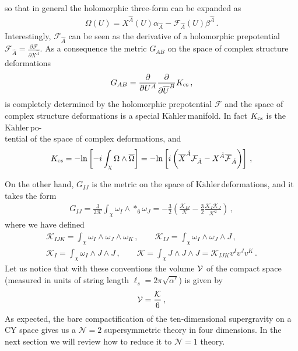 \documentclass[12pt,a4paper]{book}
\newcommand{\Kahler}{\ensuremath{\text{K}\ddot{\text{a}}\text{hler}\,}}
\newcommand{\V}{{\cal{V}}}
\begin{document}
so that in general the holomorphic three-form can be expanded as
\begin{align}
\Omega(U) = X^{\hat{A}}(U) \alpha_{\hat{A}} - \mathcal{F}_{\hat{A}}(U) \beta^{\hat{A}}\,.
\end{align}
Interestingly, $\mathcal{F}_{\hat{A}}$ can be seen as the derivative of a holomorphic prepotential $\mathcal{F}_{\hat{A}} = \frac{\partial \mathcal{F}}{\partial X^{\hat{A}}}$. As a consequence the metric $G_{AB}$ on the space of complex structure deformations
\begin{align}
\label{eq:MetricComplexStructure}
G_{AB} = \frac{\partial}{\partial U^A} \frac{\partial}{\partial \overline{U}^B} K_{\rm cs}\,,
\end{align}
is completely determined by the holomorphic prepotential $\mathcal{F}$ and the space of complex structure deformations is a special \Kahler manifold. In fact $K_{\rm cs}$ is the \Kahler po-\\	tential of the space of complex deformations, and
\begin{align}
\label{eq:KahlerPotentialComplexDeformations}
K_{\rm cs} = - \text{ln} \left[-i \int_{\chi} \Omega \wedge \overline{\Omega}\right] = - \text{ln} \left[i \left(\overline{X}^{\hat{A}} \mathcal{F}_{\hat{A}} - X^{\hat{A}} \overline{\mathcal{F}}_{\hat{A}}\right)\right] \,,
\end{align}

On the other hand, $G_{IJ}$ is the metric on the space of \Kahler deformations, and it takes the form
\begin{align}
\label{eq:MetricKahlerModuli}
G_{IJ} = \frac{3}{2 \mathcal{K}} \int_{\chi} \omega_I \wedge *_6 \omega_J = -\frac{3}{2} \left(\frac{\mathcal{K}_{IJ}}{\mathcal{K}} - \frac{3}{2} \frac{\mathcal{K}_I \mathcal{K}_J}{\mathcal{K}^2}\right)\,,
\end{align}
where we have defined
\begin{align}
\label{eq:IntersectionNumbers}
&\mathcal{K}_{IJK} = \int_{\chi} \omega_I \wedge \omega_J \wedge \omega_K \,, \qquad \mathcal{K}_{IJ} = \int_{\chi} \omega_I \wedge \omega_J \wedge J \,,& \nonumber \\
&\mathcal{K}_I = \int_{\chi} \omega_I \wedge J \wedge J \,, \qquad \mathcal{K} = \int_{\chi} J \wedge J \wedge J = \mathcal{K}_{IJK} v^I v^J v^K \,.&
\end{align}
Let us notice that with these conventions the volume $\V$ of the compact space (measured in units of string length $\ell_s = 2 \pi \sqrt{\alpha'}$) is given by
\begin{align}
\label{eq:VolumeFormal}
\V = \frac{\mathcal{K}}{6} \,,
\end{align}
As expected, the bare compactification of the ten-dimensional supergravity on a CY space gives us a $\mathcal{N} = 2$ supersymmetric theory in four dimensions. In the next section we will review how to reduce it to $\mathcal{N} = 1$ theory.
\end{document}
